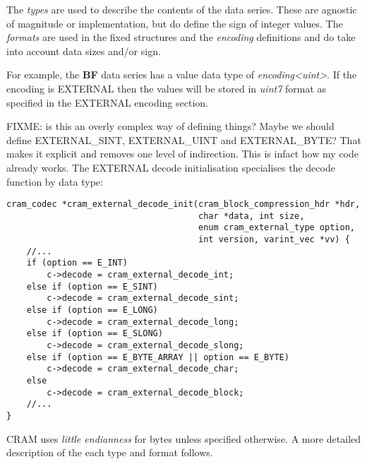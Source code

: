 \documentclass[a4paper]{article}
\begin{document}
\vskip 10pt

The \textit{types} are used to describe the contents of the data series.
These are agnostic of magnitude or implementation, but do define the sign of integer values.
The \textit{formats} are used in the fixed structures and the \textit{encoding} definitions and do take into account data sizes and/or sign.

For example, the \textbf{BF} data series has a value data type of \textit{encoding<uint>}.
If the encoding is EXTERNAL then the values will be stored in \textit{uint7} format as specified in the EXTERNAL encoding section.

{
\color{gray}
FIXME: is this an overly complex way of defining things?  Maybe we should define EXTERNAL\_SINT, EXTERNAL\_UINT and EXTERNAL\_BYTE?  That makes it explicit and removes one level of indirection.  This is infact how my code already works.  The EXTERNAL decode initialisation specialises the decode function by data type:

\begin{verbatim}
cram_codec *cram_external_decode_init(cram_block_compression_hdr *hdr,
                                      char *data, int size,
                                      enum cram_external_type option,
                                      int version, varint_vec *vv) {
    //...
    if (option == E_INT)
        c->decode = cram_external_decode_int;
    else if (option == E_SINT)
        c->decode = cram_external_decode_sint;
    else if (option == E_LONG)
        c->decode = cram_external_decode_long;
    else if (option == E_SLONG)
        c->decode = cram_external_decode_slong;
    else if (option == E_BYTE_ARRAY || option == E_BYTE)
        c->decode = cram_external_decode_char;
    else
        c->decode = cram_external_decode_block;
    //...
}
\end{verbatim}
}

\label{subsec:writing-bytes}

CRAM uses \emph{little endianness} for bytes unless specified
otherwise.  A more detailed description of the each type and format follows.
\end{document}

